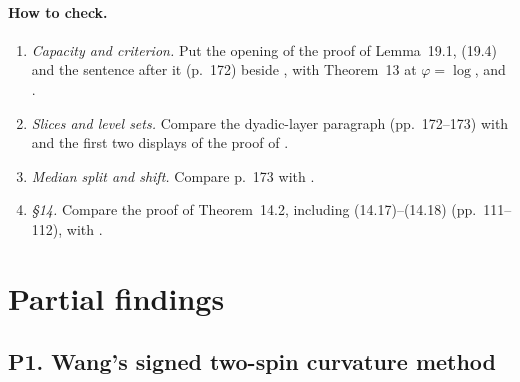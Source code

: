 \documentclass[11pt]{article}
\newcommand{\ploc}[2]{#1}
\newcommand{\sloc}[2]{\cite[#2]{#1}}
\begin{document}
\paragraph{How to check.}
\begin{enumerate}
\item \emph{Capacity and criterion.} Put the opening of the proof of
 Lemma~19.1, (19.4) and the sentence after it
 (\ploc{p.~172}{cap-entropy.tex:66--69, 87--92}) beside
 \sloc{BartheEtAl2004-InterpolatedInequalitiesOrliczIsoperimetry}{\S5.2,
 p.~31; Thm~13, p.~45; Rem.~19, pp.~46--47}, with Theorem~13 at
 $\varphi=\log$, and \sloc{BartheRoberto2003-SobolevInequalitiesRealLine}{remark~6),
 p.~496}.
\item \emph{Slices and level sets.} Compare the dyadic-layer paragraph
 (\ploc{pp.~172--173}{cap-entropy.tex:94--114}) with
 \sloc{BakryEtAl1995-SobolevInequalitiesInDisguise}{\S10.1, p.~1065} and the
 first two displays of the proof of
 \sloc{BartheEtAl2004-InterpolatedInequalitiesOrliczIsoperimetry}{Thm~11, p.~39}.
\item \emph{Median split and shift.} Compare
 \ploc{p.~173}{cap-entropy.tex:116--129} with
 \sloc{BartheRoberto2003-SobolevInequalitiesRealLine}{proof of Thm~3, p.~487;
 Lemma~4, p.~485}.
\item \emph{\S14.} Compare the proof of Theorem~14.2, including (14.17)--(14.18)
 (\ploc{pp.~111--112}{profile-entropy.tex:621--677}), with
 \sloc{BakryEtAl1995-SobolevInequalitiesInDisguise}{Thm~10.5, p.~1070;
 Lemma~7.1, pp.~1055--1057}.
\end{enumerate}

\section{Partial findings}\label{sec:partial}

\subsection{P1. Wang's signed two-spin curvature method}\label{f:P1}
\end{document}
